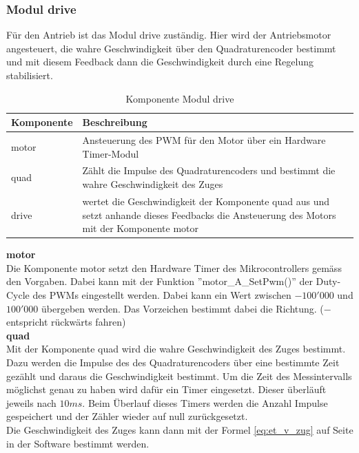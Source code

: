 \documentclass[../../main.tex]{subfiles}
\begin{document}
    \subsubsection{Modul drive} \label{et_sw_modul_drive}
    Für den Antrieb ist das Modul drive zuständig. Hier wird der Antriebsmotor angesteuert, die wahre Geschwindigkeit über den Quadraturencoder bestimmt und mit diesem Feedback dann die Geschwindigkeit durch eine Regelung stabilisiert.\\

    \begin{table}[H]
        \centering
        \begin{tabular}{|l|p{12cm}|}
        \hline
        \textbf{Komponente} & \textbf{Beschreibung}    \\ \hline
        motor  & Ansteuerung des PWM für den Motor über ein Hardware Timer-Modul \\ \hline
        quad   & Zählt die Impulse des Quadraturencoders und bestimmt die wahre Geschwindigkeit des Zuges \\ \hline
        drive  & wertet die Geschwindigkeit der Komponente quad aus und setzt anhande dieses Feedbacks die Ansteuerung des Motors mit der Komponente motor \\ \hline
        \end{tabular}
        \caption{Komponente Modul drive}
        \label{tab:et_mc_drive}
    \end{table}

    \textbf{motor}\\
    Die Komponente motor setzt den Hardware Timer des Mikrocontrollers gemäss den Vorgaben. Dabei kann mit der Funktion ''motor\_A\_SetPwm()'' der Duty-Cycle des PWMs eingestellt werden. Dabei kann ein Wert zwischen  $-100'000$ und $100'000$ übergeben werden. Das Vorzeichen bestimmt dabei die Richtung. ($-$ entspricht rückwärts fahren)\\

    \textbf{quad}\\
    Mit der Komponente quad wird die wahre Geschwindigkeit des Zuges bestimmt. Dazu werden die Impulse des des Quadraturencoders über eine bestimmte Zeit gezählt und daraus die Geschwindigkeit bestimmt. Um die Zeit des Messintervalls möglichst genau zu haben wird dafür ein Timer eingesetzt. Dieser überläuft jeweils nach $10 ms$. Beim Überlauf dieses Timers werden die Anzahl Impulse gespeichert und der Zähler wieder auf null zurückgesetzt.\\
    Die Geschwindigkeit des Zuges kann dann mit der Formel \ref{eq:et_v_zug} auf Seite \pageref{eq:et_v_zug} in der Software bestimmt werden.
\end{document}
